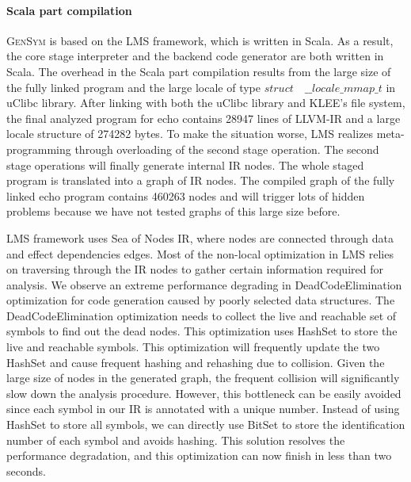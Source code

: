 \documentclass[sigplan, nonacm]{acmart}\settopmatter{printfolios=true,printccs=false,printacmref=false}
\newcommand{\tool}{\textsc{GenSym}\xspace}
\begin{document}
\paragraph*{Scala part compilation}
\tool is based on the LMS framework, which is written in Scala. As a result, the core stage interpreter and the backend code generator are both written in Scala. The overhead in the Scala part compilation results from the large size of the fully linked program and the large locale of type $struct \quad \_ \_ locale \_ mmap \_ t$ in uClibc library. After linking with both the uClibc library and KLEE's file system, the final analyzed program for echo contains 28947 lines of LLVM-IR and a large locale structure of 274282 bytes. To make the situation worse, LMS realizes meta-programming through overloading of the second stage operation. The second stage operations will finally generate internal IR nodes. The whole staged program is translated into a graph of IR nodes. The compiled graph of the fully linked echo program contains 460263 nodes and will trigger lots of hidden problems because we have not tested graphs of this large size before. \par
LMS framework uses Sea of Nodes IR, where nodes are connected through data and effect dependencies edges. Most of the non-local optimization in LMS relies on traversing through the IR nodes to gather certain information required for analysis. We observe an extreme performance degrading in DeadCodeElimination optimization for code generation caused by poorly selected data structures. The DeadCodeElimination optimization needs to collect the live and reachable set of symbols to find out the dead nodes. This optimization uses HashSet to store the live and reachable symbols. This optimization will frequently update the two HashSet and cause frequent hashing and rehashing due to collision. Given the large size of nodes in the generated graph, the frequent collision will significantly slow down the analysis procedure. However, this bottleneck can be easily avoided since each symbol in our IR is annotated with a unique number. Instead of using HashSet to store all symbols, we can directly use BitSet to store the identification number of each symbol and avoids hashing. This solution resolves the performance degradation, and this optimization can now finish in less than two seconds.\par
\end{document}
